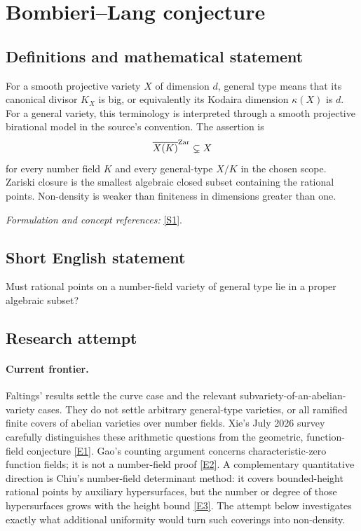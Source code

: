 \documentclass[11pt,a4paper]{article}
\newcommand{\sref}[2]{\hyperlink{source:#1:#2}{[S#2]}}
\newcommand{\eref}[2]{\hyperlink{extra:#1:#2}{[E#2]}}
\newif\ifshowcatalogue
\newcommand{\cataloguescope}[1]{\ifshowcatalogue
 \paragraph{Exact scope in the supplied catalogue.}
 \begin{quote}\small #1\end{quote}\fi}
\numberwithin{equation}{section}
\begin{document}
\setcounter{section}{0}
\clearpage
\section*{\texorpdfstring{Bombieri–Lang conjecture}{Bombieri–Lang conjecture}}\label{9400081}
\subsection{Definitions and mathematical statement}
For a smooth projective variety $X$ of dimension $d$, general type means that its canonical divisor $K_X$ is big, or equivalently its Kodaira dimension $\kappa(X)$ is $d$. For a general variety, this terminology is interpreted through a smooth projective birational model in the source's convention. The assertion is
\[
 \overline{X(K)}^{\rm Zar}\subsetneq X
\]
for every number field $K$ and every general-type $X/K$ in the chosen scope. Zariski closure is the smallest algebraic closed subset containing the rational points. Non-density is weaker than finiteness in dimensions greater than one.
\par\smallskip\textit{Formulation and concept references:} \sref{9400081}{1}.
\cataloguescope{Prove that for every variety X of general type defined over a number field K, the set of K-rational points X(K) is not Zariski dense in X.}
\subsection{Short English statement}
Must rational points on a number-field variety of general type lie in a proper algebraic subset?
\subsection{Research attempt}

\paragraph{Current frontier.}
Faltings' results settle the curve case and the relevant subvariety-of-an-abelian-variety cases. They do not settle arbitrary general-type varieties, or all ramified finite covers of abelian varieties over number fields. Xie's July 2026 survey carefully distinguishes these arithmetic questions from the geometric, function-field conjecture \eref{9400081}{1}. Gao's counting argument concerns characteristic-zero function fields; it is not a number-field proof \eref{9400081}{2}. A complementary quantitative direction is Chiu's number-field determinant method: it covers bounded-height rational points by auxiliary hypersurfaces, but the number or degree of those hypersurfaces grows with the height bound \eref{9400081}{3}. The attempt below investigates exactly what additional uniformity would turn such coverings into non-density.
\end{document}

